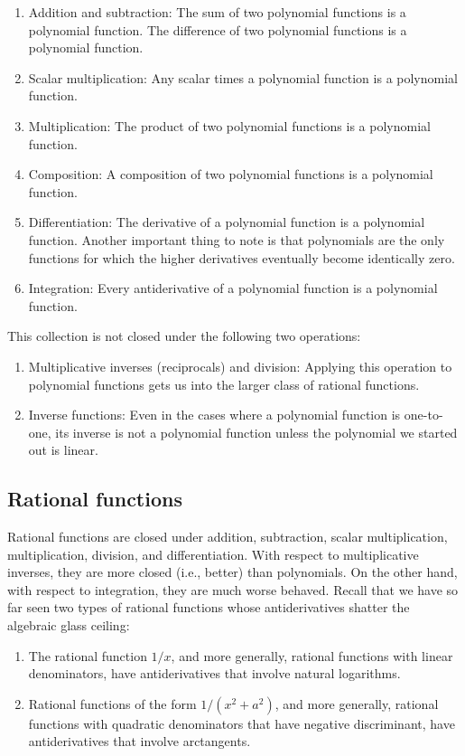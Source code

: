 \documentclass{amsart}
\begin{document}
\begin{enumerate}
\item Addition and subtraction: The sum of two polynomial functions is
  a polynomial function. The difference of two polynomial functions is a
  polynomial function.
\item Scalar multiplication: Any scalar times a polynomial function is
  a polynomial function.
\item Multiplication: The product of two polynomial functions is a
  polynomial function.
\item Composition: A composition of two polynomial functions is a
  polynomial function.
\item Differentiation: The derivative of a polynomial function is a
  polynomial function. Another important thing to note is that
  polynomials are the only functions for which the higher derivatives
  eventually become identically zero.
\item Integration: Every antiderivative of a polynomial function is a
  polynomial function.
\end{enumerate}

This collection is not closed under the following two operations:

\begin{enumerate}
\item Multiplicative inverses (reciprocals) and division: Applying
  this operation to polynomial functions gets us into the larger class
  of rational functions.
\item Inverse functions: Even in the cases where a polynomial function
  is one-to-one, its inverse is not a polynomial function unless the
  polynomial we started out is linear.
\end{enumerate}

\subsection{Rational functions}

Rational functions are closed under addition, subtraction, scalar
multiplication, multiplication, division, and differentiation. With
respect to multiplicative inverses, they are more closed (i.e.,
better) than polynomials. On the other hand, with respect to
integration, they are much worse behaved. Recall that we have so far
seen two types of rational functions whose antiderivatives shatter the
algebraic glass ceiling:

\begin{enumerate}
\item The rational function $1/x$, and more generally, rational
  functions with linear denominators, have antiderivatives that
  involve natural logarithms.
\item Rational functions of the form $1/(x^2 + a^2)$, and more
  generally, rational functions with quadratic denominators that have
  negative discriminant, have antiderivatives that involve arctangents.
\end{enumerate}
\end{document}
